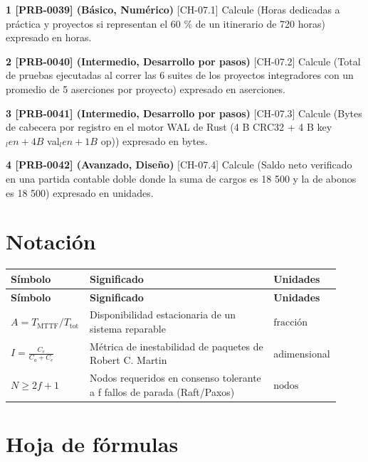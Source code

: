 \documentclass{book}
\begin{document}
\begin{tcolorbox}[title={Ejercicios}, studiumworked, breakable]

\noindent\textbf{1 [PRB-0039] (Básico, Numérico)}
[CH-07.1] Calcule (Horas dedicadas a práctica y proyectos si representan el 60 \% de un itinerario de 720 horas) expresado en horas.

\noindent\textbf{2 [PRB-0040] (Intermedio, Desarrollo por pasos)}
[CH-07.2] Calcule (Total de pruebas ejecutadas al correr las 6 suites de los proyectos integradores con un promedio de 5 aserciones por proyecto) expresado en aserciones.

\noindent\textbf{3 [PRB-0041] (Intermedio, Desarrollo por pasos)}
[CH-07.3] Calcule (Bytes de cabecera por registro en el motor WAL de Rust (4 B CRC32 + 4 B key\(_len + 4 B\) val\(_len + 1 B\) op)) expresado en bytes.

\noindent\textbf{4 [PRB-0042] (Avanzado, Diseño)}
[CH-07.4] Calcule (Saldo neto verificado en una partida contable doble donde la suma de cargos es 18 500 y la de abonos es 18 500) expresado en unidades.
\end{tcolorbox}
\appendix
\chapter{Notación}

\begingroup
\setlength{\LTpre}{0pt}
\setlength{\LTpost}{0pt}
\begin{longtable}{@{}>{\centering\arraybackslash}p{0.17\linewidth}>{\raggedright\arraybackslash}p{0.55\linewidth}>{\raggedright\arraybackslash}p{0.2\linewidth}@{}}
\textbf{Símbolo} & \textbf{Significado} & \textbf{Unidades} \\
\hline
\endfirsthead
\textbf{Símbolo} & \textbf{Significado} & \textbf{Unidades} \\
\hline
\endhead
$A = T_{\text{MTTF}} / T_{\text{tot}}$ & Disponibilidad estacionaria de un sistema reparable & $\mathrm{fracción}$ \\
$I = \frac{C_e}{C_a + C_e}$ & Métrica de inestabilidad de paquetes de Robert C. Martin & adimensional \\
$N \ge 2f + 1$ & Nodos requeridos en consenso tolerante a f fallos de parada (Raft/Paxos) & $\mathrm{nodos}$ \\
\end{longtable}
\endgroup
\chapter{Hoja de fórmulas}
\end{document}
